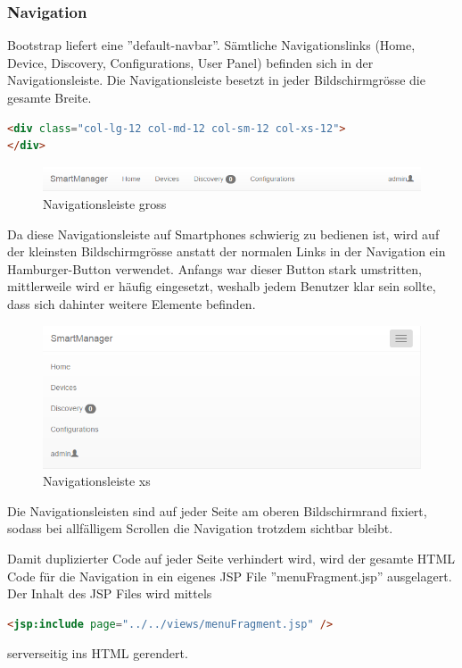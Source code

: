 \subsubsection{Navigation}
Bootstrap liefert eine ''default-navbar''. Sämtliche Navigationslinks (Home, Device, Discovery, Configurations, User Panel) befinden sich in der Navigationsleiste. Die Navigationsleiste besetzt in jeder Bildschirmgrösse die gesamte Breite.
\begin{lstlisting}[language=html]
<div class="col-lg-12 col-md-12 col-sm-12 col-xs-12">
</div>
\end{lstlisting}
\begin{figure}[H]
\centering
\includegraphics[scale=0.8]{../04_Realisierung/images/userinterface/navbar_lg.png}
\caption{Navigationsleiste gross}
\end{figure}

Da diese Navigationsleiste auf Smartphones schwierig zu bedienen ist, wird auf der kleinsten Bildschirmgrösse anstatt der normalen Links in der Navigation ein Hamburger-Button verwendet. Anfangs war dieser Button stark umstritten, mittlerweile wird er häufig eingesetzt, weshalb jedem Benutzer klar sein sollte, dass sich dahinter weitere Elemente befinden.
\begin{figure}[H]
\centering
\includegraphics[scale=0.87]{../04_Realisierung/images/userinterface/navbar_xs.png}
\caption{Navigationsleiste xs}
\end{figure}

Die Navigationsleisten sind auf jeder Seite am oberen Bildschirmrand fixiert, sodass bei allfälligem Scrollen die Navigation trotzdem sichtbar bleibt.

Damit duplizierter Code auf jeder Seite verhindert wird, wird der gesamte HTML Code für die Navigation in ein eigenes JSP File ''menuFragment.jsp'' ausgelagert. Der Inhalt des JSP Files wird mittels 
\begin{lstlisting}[language=html]
<jsp:include page="../../views/menuFragment.jsp" />
\end{lstlisting}
serverseitig ins HTML gerendert.
